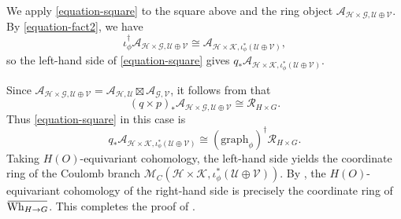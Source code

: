 \documentclass[11pt]{amsart}
\theoremstyle{definition}
\theoremstyle{plain}
\theoremstyle{remark}
\newcommand{\overbar}[1]{\mkern 1.5mu\overline{\mkern-1.5mu#1\mkern-1.5mu}\mkern 1.5mu}
\begin{document}
    We apply \eqref{equation-square} to the square above and the ring object $\mathcal{A}_{\mathcal{H} \times \mathcal{G}, \mathcal{U} \oplus \mathcal{V}}$. By \eqref{equation-fact2}, we have
    \[
        \iota_\phi^\dagger\mathcal{A}_{\mathcal{H} \times \mathcal{G}, \mathcal{U} \oplus \mathcal{V}} \cong \mathcal{A}_{\mathcal{H} \times \mathcal{K}, \iota_\phi^*(\mathcal{U} \oplus \mathcal{V})},
    \]
    so the left-hand side of \eqref{equation-square} gives $q_*\mathcal{A}_{\mathcal{H} \times \mathcal{K}, \iota_\phi^*(\mathcal{U} \oplus \mathcal{V})}$.

    Since $\mathcal{A}_{\mathcal{H} \times \mathcal{G}, \mathcal{U} \oplus \mathcal{V}} = \mathcal{A}_{\mathcal{H}, \mathcal{U}} \boxtimes\mathcal{A}_{\mathcal{G}, \mathcal{V}}$, it follows from  that 
    \[
        (q \times p)_*\mathcal{A}_{\mathcal{H} \times \mathcal{G}, \mathcal{U} \oplus \mathcal{V}} \cong \mathcal{R}_{H \times G}.
    \]
    Thus \eqref{equation-square} in this case is
    \begin{equation}\label{equation-final2}
        q_*\mathcal{A}_{\mathcal{H} \times \mathcal{K}, \iota_\phi^*(\mathcal{U} \oplus \mathcal{V})} \cong (\mathrm{graph}_{\phi})^\dagger\mathcal{R}_{H \times G}.
    \end{equation}
    Taking $H(O)$-equivariant cohomology, the left-hand side yields the coordinate ring of the Coulomb branch $\mathcal{M}_C(\mathcal{H} \times \mathcal{K}, \iota_\phi^*(\mathcal{U} \oplus \mathcal{V}))$. By \cite[Theorem 2.2.2(ii)]{ginzburg2025pointwisepurityderivedsatake}, the $H(O)$-equivariant cohomology of the right-hand side is precisely the coordinate ring of $\overbar{\mathrm{Wh}_{H \to G}}$. This completes the proof of .
    
    \printbibliography
\end{document}
